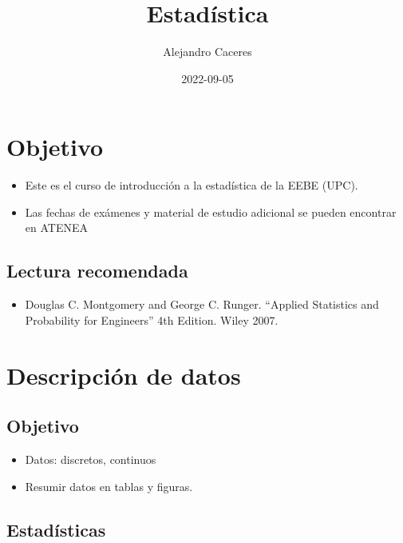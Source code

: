 \documentclass[
]{book}
\title{Estadística}
\author{Alejandro Caceres}
\date{2022-09-05}
\providecommand{\tightlist}{%
  \setlength{\itemsep}{0pt}\setlength{\parskip}{0pt}}
\begin{document}
\maketitle

{
\setcounter{tocdepth}{1}
\tableofcontents
}
\hypertarget{objetivo}{%
\chapter{Objetivo}\label{objetivo}}

\begin{itemize}
\item
  Este es el curso de introducción a la estadística de la EEBE (UPC).
\item
  Las fechas de exámenes y material de estudio adicional se pueden encontrar en ATENEA
\end{itemize}

\hypertarget{lectura-recomendada}{%
\section{Lectura recomendada}\label{lectura-recomendada}}

\begin{itemize}
\tightlist
\item
  Douglas C. Montgomery and George C. Runger. ``Applied Statistics and Probability for Engineers'' 4th Edition. Wiley 2007.
\end{itemize}

\hypertarget{descripciuxf3n-de-datos}{%
\chapter{Descripción de datos}\label{descripciuxf3n-de-datos}}

\hypertarget{objetivo-1}{%
\section{Objetivo}\label{objetivo-1}}

\begin{itemize}
\tightlist
\item
  Datos: discretos, continuos
\item
  Resumir datos en tablas y figuras.
\end{itemize}

\hypertarget{estaduxedsticas}{%
\section{Estadísticas}\label{estaduxedsticas}}
\end{document}
